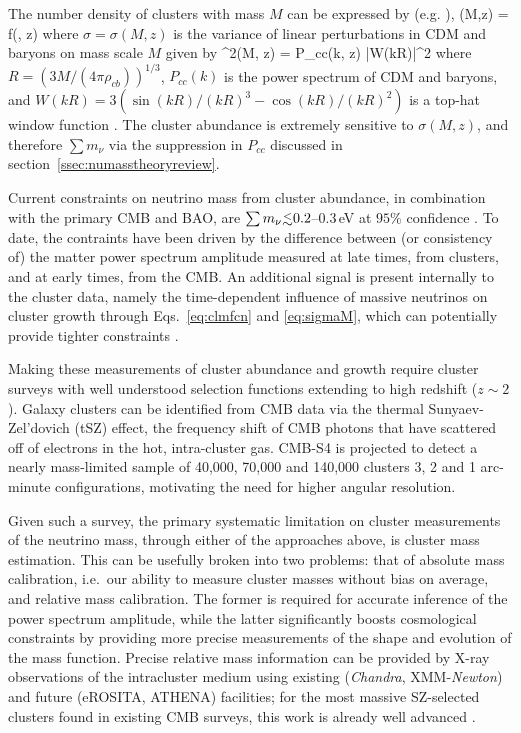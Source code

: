 The number density of clusters with mass $M$ can be expressed by (e.g. \cite{Tinker:2008ff,Bhattacharya:2010wy}), 
\beq
\label{eq:clmfcn}
(M,z) =  f(\sigma, z)
\eeq
where $\sigma = \sigma(M,z)$ is the variance of linear perturbations in CDM and baryons on mass scale $M$ given by
\beq
\label{eq:sigmaM}
\sigma^2(M, z) = \int {}  P_{cc}(k, z) |W(kR)|^2
\eeq
where $R = (3M/(4\pi \rho_{cb}))^{1/3}$, $P_{cc}(k)$ is the power spectrum of CDM and baryons, and $W(kR) = 3(\sin(kR)/(kR)^3 - \cos(kR)/(kR)^2)$ is a top-hat window function \cite{Costanzi:2013bha,LoVerde:2014rxa}. The cluster abundance is extremely sensitive to $\sigma(M, z)$, and therefore $\sum m_\nu$ via the suppression in $P_{cc}$ discussed in section~\ref{ssec:numasstheoryreview}.

Current constraints on neutrino mass from cluster abundance, in combination with the primary CMB and BAO, are $\sum m_\nu \lsim 0.2$--$0.3$\,eV at $95\%$ confidence \cite{Hasselfield:2013wf,Mantz:2014paa,Ade:2015fva,deHaan:2016qvy}. To date, the contraints have been driven by the difference between (or consistency of) the matter power spectrum amplitude measured at late times, from clusters, and at early times, from the CMB. An additional signal is present internally to the cluster data, namely the time-dependent influence of massive neutrinos on cluster growth through Eqs.~\ref{eq:clmfcn} and \ref{eq:sigmaM}, which can potentially provide tighter constraints \cite{Wang:2005vr}.


Making these measurements of cluster abundance and growth require cluster surveys with well understood selection functions extending to high redshift ($z\sim2$). Galaxy clusters can be identified from CMB data via the thermal Sunyaev-Zel'dovich (tSZ) effect, the frequency shift of CMB photons that have scattered off of electrons in the hot, intra-cluster gas.  CMB-S4 is projected to detect a nearly mass-limited sample of 40,000, 70,000 and 140,000 clusters 3, 2 and 1 arc-minute configurations, motivating the need for higher angular resolution.

Given such a survey, the primary systematic limitation on cluster measurements of the neutrino mass, through either of the approaches above, is cluster mass estimation. This can be usefully broken into two problems: that of absolute mass calibration, i.e.\ our ability to measure cluster masses without bias on average, and relative mass calibration. The former is required for accurate inference of the power spectrum amplitude, while the latter significantly boosts cosmological constraints by providing more precise measurements of the shape and evolution of the mass function. Precise relative mass information can be provided by X-ray observations of the intracluster medium using existing ({\it Chandra}, XMM-{\it Newton}) and future (eROSITA, ATHENA) facilities; for the most massive SZ-selected clusters found in existing CMB surveys, this work is already well advanced \cite{deHaan:2016qvy, Andersson:2010vy}. 

